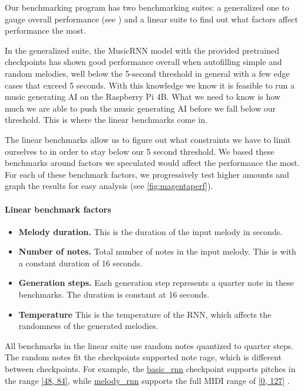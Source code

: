 Our benchmarking program has two benchmarking suites: a generalized one to gauge overall
performance (see ) and a linear suite to find out what
factors affect performance the most.

In the generalized suite, the MusicRNN model with the provided pretrained checkpoints has
shown good performance overall when autofilling simple and random melodies, well below the
5-second threshold in general with a few edge cases that exceed 5 seconds. With this
knowledge we know it is feasible to run a music generating AI on the Raspberry Pi 4B. What
we need to know is how much we are able to push the music generating AI before we fall
below our threshold. This is where the linear benchmarks come in.

The linear benchmarks allow us to figure out what constraints we have to limit ourselves
to in order to stay below our 5 second threshold. We based these benchmarks around factors
we speculated would affect the performance the most. For each of these benchmark factors,
we progressively test higher amounts and graph the results for easy analysis (see
\autoref{fig:magentaperf}).

\paragraph{Linear benchmark factors}
\begin{itemize}
  \item \textbf{Melody duration.} This is the duration of the input melody in seconds.
  \item \textbf{Number of notes.} Total number of notes in the input melody. This is with
        a constant duration of 16 seconds.
  \item \textbf{Generation steps.} Each generation step represents a quarter note in these
        benchmarks. The duration is constant at 16 seconds.
  \item \textbf{Temperature} This is the temperature of the RNN, which affects the
        randomness of the generated melodies.
\end{itemize}

All benchmarks in the linear suite use random notes quantized to quarter steps. The random
notes fit the checkpoints supported note rage, which is different between checkpoints. For
example, the \url{basic_rnn} checkpoint supports pitches in the range \url{[48, 84]},
while \url{melody_rnn} supports the full MIDI range of \url{[0, 127]}
\autocite{modelPitchRange}.

